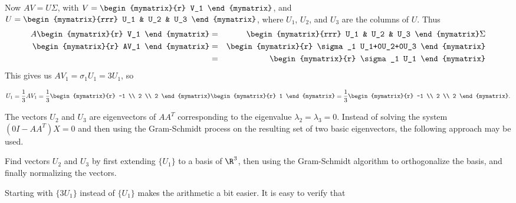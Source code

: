 \begin{solution}
Now $AV=U\Sigma$, with
$V=\begin{mymatrix}{r} V_1 \end{mymatrix}$,
and $U=\begin{mymatrix}{rrr} U_1 & U_2 & U_3 \end{mymatrix}$,
where $U_1$, $U_2$, and $U_3$ are the columns of $U$.
Thus
\begin{eqnarray*}
A\begin{mymatrix}{r} V_1 \end{mymatrix}
&=& \begin{mymatrix}{rrr} U_1 & U_2 & U_3 \end{mymatrix}\Sigma\\
\begin{mymatrix}{r} AV_1 \end{mymatrix}
&=& \begin{mymatrix}{r} \sigma_1 U_1+0U_2+0U_3 \end{mymatrix}\\
&=& \begin{mymatrix}{r} \sigma_1 U_1 \end{mymatrix}
\end{eqnarray*}
This gives us $AV_1=\sigma_1 U_1= 3U_1$, so

\[ U_1 = \frac{1}{3}AV_1 
= \frac{1}{3}
\begin{mymatrix}{r} -1 \\ 2 \\ 2 \end{mymatrix}
\begin{mymatrix}{r} 1 \end{mymatrix}
= \frac{1}{3}
\begin{mymatrix}{r} -1 \\ 2 \\ 2 \end{mymatrix}.\]

The vectors $U_2$ and $U_3$ are eigenvectors of $AA^T$ corresponding
to the eigenvalue $\lambda_2=\lambda_3=0$.
Instead of solving the system $(0I-AA^T)X= 0$ and then using the
Gram-Schmidt process on the resulting set of
two basic eigenvectors, the following approach may be used.


Find vectors $U_2$ and $U_3$ by first extending $\{ U_1\}$ to a basis of
$\R^3$, then using the Gram-Schmidt algorithm to orthogonalize the basis,
and finally normalizing the vectors.

Starting with $\{ 3U_1 \}$ instead of $\{ U_1 \}$ makes the
arithmetic a bit easier.
It is easy to verify that


\end{solution}
